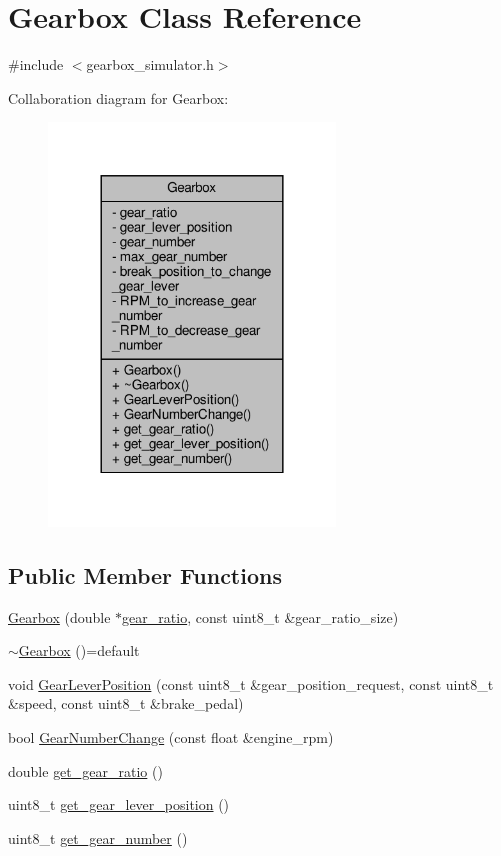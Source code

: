 \hypertarget{classGearbox}{}\section{Gearbox Class Reference}
\label{classGearbox}


{\ttfamily \#include $<$gearbox\+\_\+simulator.\+h$>$}



Collaboration diagram for Gearbox\+:
\nopagebreak
\begin{figure}[H]
\begin{center}
\leavevmode
\includegraphics[width=216pt]{classGearbox__coll__graph}
\end{center}
\end{figure}
\subsection*{Public Member Functions}
\begin{DoxyCompactItemize}
\item 
\hyperlink{classGearbox_ad69644f532bef91882a7ee5142072db9}{Gearbox} (double $\ast$\hyperlink{classGearbox_abb63a875027a74947b345a080f012042}{gear\+\_\+ratio}, const uint8\+\_\+t \&gear\+\_\+ratio\+\_\+size)
\item 
\hyperlink{classGearbox_a61e8c826de0c32d2acdfca6710209b11}{$\sim$\+Gearbox} ()=default
\item 
void \hyperlink{classGearbox_aca889116aa57b83145c51a5fe6ca3319}{Gear\+Lever\+Position} (const uint8\+\_\+t \&gear\+\_\+position\+\_\+request, const uint8\+\_\+t \&speed, const uint8\+\_\+t \&brake\+\_\+pedal)
\item 
bool \hyperlink{classGearbox_a7204cb43a9a923283b7d8994e8d1317d}{Gear\+Number\+Change} (const float \&engine\+\_\+rpm)
\item 
double \hyperlink{classGearbox_ad53da0be7891d702873f2a97e0f49c3a}{get\+\_\+gear\+\_\+ratio} ()
\item 
uint8\+\_\+t \hyperlink{classGearbox_a6e3e4eefa42a5811396aee1fad572adc}{get\+\_\+gear\+\_\+lever\+\_\+position} ()
\item 
uint8\+\_\+t \hyperlink{classGearbox_afa81be24e956de8328e32fd1e361eff7}{get\+\_\+gear\+\_\+number} ()
\end{DoxyCompactItemize}
